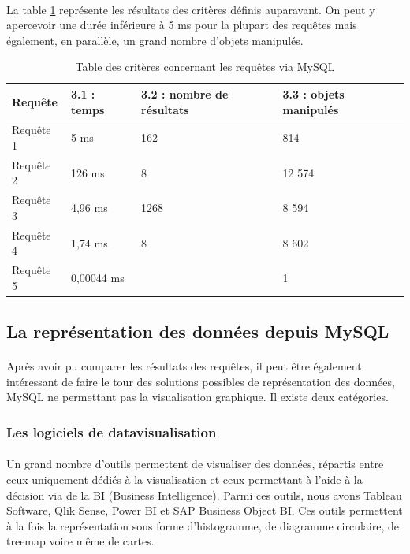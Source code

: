 \paragraph{}La table \ref{tab:critere-req1mysqlbase} représente les résultats des critères définis auparavant. On peut y apercevoir une durée inférieure à 5 ms pour la plupart des requêtes mais également, en parallèle, un grand nombre d'objets manipulés.
\begin{table}[!h]
    \centering
	\begin{tabular}{|p{3cm}|p{3cm}|p{3cm}|p{3cm}|} 
  	\hline
  	\textbf{Requête} & \textbf{3.1 : temps} & \textbf{3.2 : nombre de résultats} & \textbf{3.3 : objets manipulés} \\

  	\hline
  	Requête 1 & 5 ms & 162 & 814 \\
  	\hline
    Requête 2 & 126 ms & 8 & 12 574 \\
    \hline
    Requête 3 & 4,96 ms & 1268 & 8 594 \\
    \hline
    Requête 4 & 1,74 ms & 8 & 8 602 \\
    \hline
    Requête 5 & 0,00044 ms & & 1 \\
    \hline
	\end{tabular}
    \caption{Table des critères concernant les requêtes via MySQL}
    \label{tab:critere-req1mysqlbase}
\end{table}
\newpage
\subsection{La représentation des données depuis MySQL}
\paragraph{}Après avoir pu comparer les résultats des requêtes, il peut être également intéressant de faire le tour des solutions possibles de représentation des données, MySQL ne permettant pas la visualisation graphique. Il existe deux catégories.

\subsubsection{Les logiciels de datavisualisation}
\paragraph{}Un grand nombre d'outils permettent de visualiser des données, répartis entre ceux uniquement dédiés à la visualisation et ceux permettant à l'aide à la décision via de la BI (Business Intelligence). Parmi ces outils, nous avons Tableau Software, Qlik Sense, Power BI et SAP Business Object BI. Ces outils permettent à la fois la représentation sous forme d'histogramme, de diagramme circulaire, de treemap voire même de cartes.

